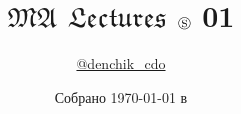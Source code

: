 \title{\huge \textbf{$\mathfrak{MA}$ $\mathfrak{Lectures}$ \quad \(\circledS\) 01}}
\author{
  \href{https://t.me/denchik_cdo}{@denchik\_cdo}
}
\date{Собрано {\ddmmyyyydate\today} в \currenttime}
\newcommand{\githublink}{https://github.com/den-swe}
